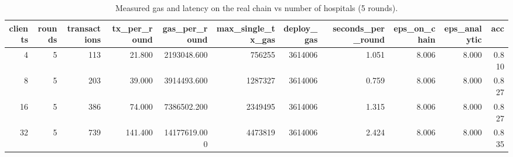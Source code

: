 \begin{table}
\caption{Measured gas and latency on the real chain vs number of hospitals (5 rounds).}
\label{tab:T10_chain_overhead}
\begin{tabular}{rrrrrrrrrrr}
\toprule
clients & rounds & transactions & tx\_per\_round & gas\_per\_round & max\_single\_tx\_gas & deploy\_gas & seconds\_per\_round & eps\_on\_chain & eps\_analytic & acc \\
\midrule
4 & 5 & 113 & 21.800 & 2193048.600 & 756255 & 3614006 & 1.051 & 8.006 & 8.000 & 0.810 \\
8 & 5 & 203 & 39.000 & 3914493.600 & 1287327 & 3614006 & 0.759 & 8.006 & 8.000 & 0.827 \\
16 & 5 & 386 & 74.000 & 7386502.200 & 2349495 & 3614006 & 1.315 & 8.006 & 8.000 & 0.827 \\
32 & 5 & 739 & 141.400 & 14177619.000 & 4473819 & 3614006 & 2.424 & 8.006 & 8.000 & 0.835 \\
\bottomrule
\end{tabular}
\end{table}

